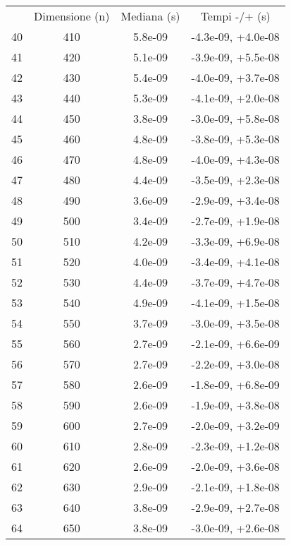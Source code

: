 \begin{table}
\centering
\begin{adjustbox}{width=1\textwidth/2}
\begin{tabular}{|c|c|c|c|}
\hline
 & Dimensione (n) & Mediana (s) & Tempi -/+ (s) \\
40 & 410 & 5.8e-09 & -4.3e-09, +4.0e-08 \\
\cline{1-4}
41 & 420 & 5.1e-09 & -3.9e-09, +5.5e-08 \\
\cline{1-4}
42 & 430 & 5.4e-09 & -4.0e-09, +3.7e-08 \\
\cline{1-4}
43 & 440 & 5.3e-09 & -4.1e-09, +2.0e-08 \\
\cline{1-4}
44 & 450 & 3.8e-09 & -3.0e-09, +5.8e-08 \\
\cline{1-4}
45 & 460 & 4.8e-09 & -3.8e-09, +5.3e-08 \\
\cline{1-4}
46 & 470 & 4.8e-09 & -4.0e-09, +4.3e-08 \\
\cline{1-4}
47 & 480 & 4.4e-09 & -3.5e-09, +2.3e-08 \\
\cline{1-4}
48 & 490 & 3.6e-09 & -2.9e-09, +3.4e-08 \\
\cline{1-4}
49 & 500 & 3.4e-09 & -2.7e-09, +1.9e-08 \\
\cline{1-4}
50 & 510 & 4.2e-09 & -3.3e-09, +6.9e-08 \\
\cline{1-4}
51 & 520 & 4.0e-09 & -3.4e-09, +4.1e-08 \\
\cline{1-4}
52 & 530 & 4.4e-09 & -3.7e-09, +4.7e-08 \\
\cline{1-4}
53 & 540 & 4.9e-09 & -4.1e-09, +1.5e-08 \\
\cline{1-4}
54 & 550 & 3.7e-09 & -3.0e-09, +3.5e-08 \\
\cline{1-4}
55 & 560 & 2.7e-09 & -2.1e-09, +6.6e-09 \\
\cline{1-4}
56 & 570 & 2.7e-09 & -2.2e-09, +3.0e-08 \\
\cline{1-4}
57 & 580 & 2.6e-09 & -1.8e-09, +6.8e-09 \\
\cline{1-4}
58 & 590 & 2.6e-09 & -1.9e-09, +3.8e-08 \\
\cline{1-4}
59 & 600 & 2.7e-09 & -2.0e-09, +3.2e-09 \\
\cline{1-4}
60 & 610 & 2.8e-09 & -2.3e-09, +1.2e-08 \\
\cline{1-4}
61 & 620 & 2.6e-09 & -2.0e-09, +3.6e-08 \\
\cline{1-4}
62 & 630 & 2.9e-09 & -2.1e-09, +1.8e-08 \\
\cline{1-4}
63 & 640 & 3.8e-09 & -2.9e-09, +2.7e-08 \\
\cline{1-4}
64 & 650 & 3.8e-09 & -3.0e-09, +2.6e-08 \\

\end{tabular}
\end{adjustbox}
\end{table}
